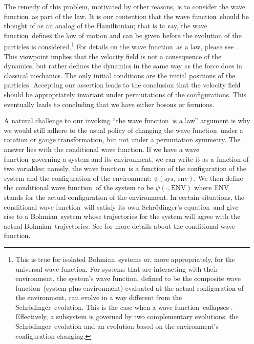 \documentclass[11pt]{article}
\theoremstyle{remark}
\begin{document}
The remedy of this problem, motivated by other reasons, is to consider
the wave function\ as part of the law. 
It is our contention that the
wave function\ should be thought of as an analog of the Hamiltonian; that is to say,
the wave function\ defines the law of motion and can be given before the
evolution of the particles is considered.\footnote{
This is true for isolated Bohmian\ systems or, more appropriately, for
the universal wave function. For systems that are
interacting  
with their environment, the system's wave function, defined to be the composite
wave function\ (system plus environment)
evaluated at the actual configuration of the environment, can evolve
in a way different from the Schr\"odinger\ evolution. This is the case  when
a wave function\ collapses \cite{DGZ92}. Effectively, a subsystem is governed by two
complementary evolutions: the Schr\"odinger\ evolution
and an evolution based on
the environment's configuration changing. 
}
For details on the wave function\ as a law, please see \cite{DGZ97}. This
viewpoint implies that the velocity 
field  is not a consequence of the dynamics, but rather defines the
dynamics in the same way as the force does in classical mechanics. 
The only initial conditions are the initial positions of the particles. 
Accepting our assertion leads to the conclusion that the velocity
field should be appropriately invariant under permutations of the
configurations. This eventually leads to concluding that we have either
bosons or fermions.


A natural challenge to our invoking ``the wave function\ is a law'' argument is
why we would still adhere to the usual policy of changing  the wave function\ under a
rotation or gauge transformation, but not under a permutation
symmetry. 
The answer lies with the conditional wave function. If we have a
wave function\ governing a system and its environment, we can write it as a
function of two variables; namely, the wave function\ is a function of the
configuration of the system and the configuration of the environment:
$\ensuremath{\psi}(\text{sys, env})$. We 
then define the conditional wave function\ of the system to be $\ensuremath{\psi}(\cdot,
\text{ENV})$ where ENV stands for the actual configuration of the
environment. In certain situations, the conditional wave function\ will satisfy
its own Schr\"odinger's equation\ and give rise to a Bohmian\ system whose trajectories for
the system will agree with the actual Bohmian\ trajectories. See
\cite{DGZ92} for more details about the conditional wave function. 
\end{document}
